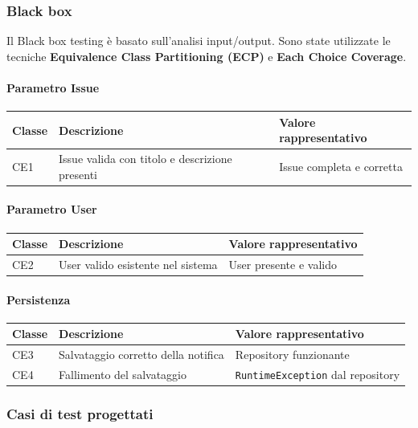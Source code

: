 \documentclass[a4paper,12pt]{article}
\begin{document}
\subsubsection{Black box}
Il Black box testing è basato sull'analisi input/output. Sono state utilizzate le tecniche \textbf{Equivalence Class Partitioning (ECP)} e \textbf{Each Choice Coverage}.

\paragraph{Parametro Issue}
\begin{longtable}{|p{1.8cm}|p{6cm}|p{5.5cm}|}
\hline
\textbf{Classe} & \textbf{Descrizione} & \textbf{Valore rappresentativo} \\ \hline
CE1 & Issue valida con titolo e descrizione presenti & Issue completa e corretta \\ \hline
\end{longtable}

\paragraph{Parametro User}
\begin{longtable}{|p{1.8cm}|p{6cm}|p{5.5cm}|}
\hline
\textbf{Classe} & \textbf{Descrizione} & \textbf{Valore rappresentativo} \\ \hline
CE2 & User valido esistente nel sistema & User presente e valido \\ \hline
\end{longtable}

\paragraph{Persistenza}
\begin{longtable}{|p{1.8cm}|p{6cm}|p{5.5cm}|}
\hline
\textbf{Classe} & \textbf{Descrizione} & \textbf{Valore rappresentativo} \\ \hline
CE3 & Salvataggio corretto della notifica & Repository funzionante \\ \hline
CE4 & Fallimento del salvataggio & \texttt{RuntimeException} dal repository \\ \hline
\end{longtable}

\subsubsection{Casi di test progettati}
\end{document}

